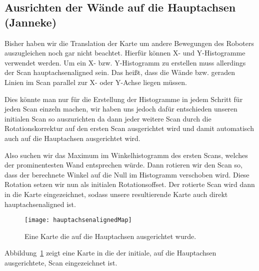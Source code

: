 \subsection{Ausrichten der Wände auf die Hauptachsen (Janneke)}

Bisher haben wir die Translation der Karte um andere Bewegungen des Roboters auszugleichen noch gar nicht beachtet. Hierfür können X- und Y-Histogramme verwendet werden. Um ein X- bzw. Y-Histogramm zu erstellen muss allerdings der Scan hauptachsenaligned sein. Das heißt, dass die Wände bzw. geraden Linien im Scan parallel zur X- oder Y-Achse liegen müssen.

Dies könnte man nur für die Erstellung der Histogramme in jedem Schritt für jeden Scan einzeln machen, wir haben uns jedoch dafür entschieden unseren initialen Scan so auszurichten da dann jeder weitere Scan durch die Rotationskorrektur auf den ersten Scan ausgerichtet wird und damit automatisch auch auf die Hauptachsen ausgerichtet wird.

Also suchen wir das Maximum im Winkelhistogramm des ersten Scans, welches der prominentesten Wand entsprechen würde. Dann rotieren wir den Scan so, dass der berechnete Winkel auf die Null im Histogramm verschoben wird. Diese Rotation setzen wir nun als initialen Rotationsoffset. Der rotierte Scan wird dann in die Karte eingezeichnet, sodass unsere resultierende Karte auch direkt hauptachsenaligned ist.

\begin{figure}
	\centering
	\texttt{[image: hauptachsenalignedMap]}
	\caption{Eine Karte die auf die Hauptachsen ausgerichtet wurde.}
	\label{fig:Hauptachsenaligned}
\end{figure}

Abbildung~\ref{fig:Hauptachsenaligned} zeigt eine Karte in die der initiale, auf die Hauptachsen ausgerichtete, Scan eingezeichnet ist.